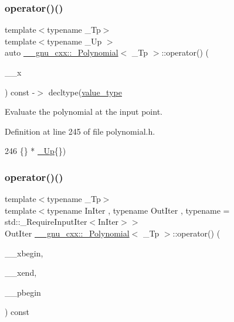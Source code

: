 \subsubsection{\texorpdfstring{operator()()}{operator()()}\hspace{0.1cm}{\footnotesize\ttfamily [3/4]}}
{\footnotesize\ttfamily template$<$typename \+\_\+\+Tp$>$ \\
template$<$typename \+\_\+\+Up $>$ \\
auto \hyperlink{class____gnu__cxx_1_1__Polynomial}{\+\_\+\+\_\+gnu\+\_\+cxx\+::\+\_\+\+Polynomial}$<$ \+\_\+\+Tp $>$\+::operator() (\begin{DoxyParamCaption}\item[{\hyperlink{class____gnu__cxx_1_1__Polynomial_a242114d4b86648a5dff67a8221f80d40}{\+\_\+\+Up}}]{\+\_\+\+\_\+x }\end{DoxyParamCaption}) const -\/$>$ decltype(\hyperlink{class____gnu__cxx_1_1__Polynomial_a725563351f50e76084a7a016c06f8a53}{value\+\_\+type}\hspace{0.3cm}{\ttfamily [inline]}}

Evaluate the polynomial at the input point. 

Definition at line 245 of file polynomial.\+h.


\begin{DoxyCode}
246                               \{\} * \hyperlink{class____gnu__cxx_1_1__Polynomial_a242114d4b86648a5dff67a8221f80d40}{\_Up}\{\})
\end{DoxyCode}
\mbox{\label{class____gnu__cxx_1_1__Polynomial_a06d7b0b57d6764da29049b3c2b6f890c}} 
\subsubsection{\texorpdfstring{operator()()}{operator()()}\hspace{0.1cm}{\footnotesize\ttfamily [4/4]}}
{\footnotesize\ttfamily template$<$typename \+\_\+\+Tp$>$ \\
template$<$typename In\+Iter , typename Out\+Iter , typename  = std\+::\+\_\+\+Require\+Input\+Iter$<$\+In\+Iter$>$$>$ \\
Out\+Iter \hyperlink{class____gnu__cxx_1_1__Polynomial}{\+\_\+\+\_\+gnu\+\_\+cxx\+::\+\_\+\+Polynomial}$<$ \+\_\+\+Tp $>$\+::operator() (\begin{DoxyParamCaption}\item[{const In\+Iter \&}]{\+\_\+\+\_\+xbegin,  }\item[{const In\+Iter \&}]{\+\_\+\+\_\+xend,  }\item[{Out\+Iter \&}]{\+\_\+\+\_\+pbegin }\end{DoxyParamCaption}) const\hspace{0.3cm}{\ttfamily [inline]}}

